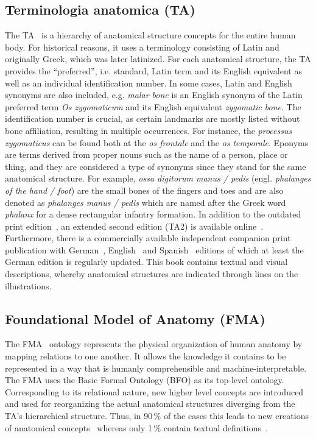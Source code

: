\documentclass[sw]{iosart2x}
\begin{document}
\subsection{Terminologia anatomica (TA)}
The TA~\citep{ta2} is a hierarchy of anatomical structure concepts for the entire human body.
For historical reasons, it uses a terminology consisting of Latin and originally Greek, which was later latinized.
For each anatomical structure, the TA provides the \enquote{preferred}, i.e. standard, Latin term and its English equivalent as well as an individual identification number.
In some cases, Latin and English synonyms are also included, e.g. \emph{malar bone} is an English synonym of the Latin preferred term \emph{Os zygomaticum} and its English equivalent \emph{zygomatic bone}.
The identification number is crucial, as certain landmarks are mostly listed without bone affiliation, resulting in multiple occurrences. %
For instance, the \emph{processus zygomaticus} can be found both at the \emph{os frontale} and the \emph{os temporale}.
Eponyms are terms derived from proper nouns such as the name of a person, place or thing, and they are considered a type of synonyms since they stand for the same anatomical structure.
For example, \emph{ossa digitorum manus / pedis} (engl. \emph{phalanges of the hand / foot}) are the small bones of the fingers and toes and are also denoted as \emph{phalanges manus / pedis} which are named after the Greek word \emph{phalanx} for a dense rectangular infantry formation.
In addition to the outdated print edition~\citep{ta1998}, an extended second edition (TA2) is available online~\citep{ta2}.
Furthermore, there is a commercially available independent companion print publication with German~\citep{anatomylexicon}, English~\citep{pocketatlas} and Spanish~\citep{taspanish} editions of which at least the German edition is regularly updated.
This book contains textual and visual descriptions, whereby anatomical structures are indicated through lines on the illustrations.

\subsection{Foundational Model of Anatomy (FMA)}
The FMA~\citep{fma} ontology represents the physical organization of human anatomy by mapping relations to one another.
It allows the knowledge it contains to be represented in a way that is humanly comprehensible and machine-interpretable.
The FMA uses the Basic Formal Ontology (BFO) as its top-level ontology.
Corresponding to its relational nature, new higher level concepts are introduced and used for reorganizing the actual anatomical structures diverging from the TA's hierarchical structure.
Thus, in 90\,\% of the cases this leads to new creations of anatomical concepts~\citep{anatomicalterms} whereas only 1\,\% contain textual definitions~\citep{uberon}.
\end{document}
